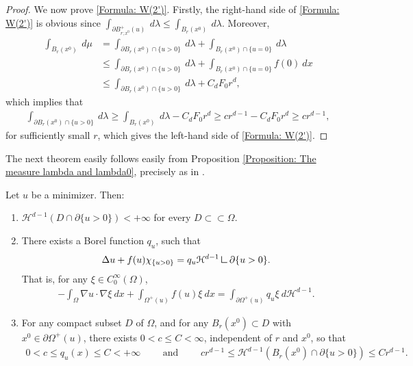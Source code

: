 \documentclass[11pt,reqno]{amsart}
\begin{document}
\begin{proof}
    We now prove \eqref{Formula: W(2')}. Firstly, the right-hand side of \eqref{Formula: W(2')} is obvious since $\int_{\partial B_{r;x^{0}}^{+}(u)}\:d\lambda\leqslant\int_{B_{r}(x^{0})}\:d\lambda$. Moreover,
    \begin{align*}
    	\int_{B_{r}(x^{0})}\:d\mu&=\int_{\partial B_{r}(x^{0})\cap\{u>0\}}\:d\lambda+\int_{B_{r}(x^{0})\cap\{u=0\}}\:d\lambda\\
    	&\leqslant\int_{\partial B_{r}(x^{0})\cap\{u>0\}}\:d\lambda+\int_{B_{r}(x^{0})\cap\{u=0\}}f(0)\:dx\\
    	&\leqslant\int_{\partial B_{r}(x^{0})\cap\{u>0\}}\:d\lambda+C_{d}F_{0}r^{d},
    \end{align*}
    which implies that
    \begin{align*}
    	\int_{\partial B_{r}(x^{0})\cap\{u>0\}}\:d\lambda\geqslant\int_{B_{r}(x^{0})}\:d\lambda-C_{d}F_{0}r^{d}\geqslant cr^{d-1}-C_{d}F_{0}r^{d}\geqslant cr^{d-1},
    \end{align*}
    for sufficiently small $r$, which gives the left-hand side of \eqref{Formula: W(2')}.
\end{proof}
The next theorem easily follows easily from Proposition \ref{Proposition: The measure lambda and lambda0}, precisely as in \cite{AC1981}.
\begin{theorem}\label{Theorem: representation theorem}
	Let $u$ be a minimizer. Then:
	\begin{enumerate}
		\item $\mathcal{H}^{d-1}(D\cap\partial\{u>0\})<+\infty$ for every $D\subset\subset\Omega$.
		\item There exists a Borel function $q_{u}$, such that
		\begin{align*}
			\Delta u+f(u)\chi_{\{u>0\}}=q_{u}\mathcal{H}^{d-1}\mres{\partial\{u>0\}}.
		\end{align*}
	   That is, for any $\xi\in C_{0}^{\infty}(\Omega)$,
	   \begin{align*}
	   	   -\int_{\Omega}\nabla u\cdot\nabla\xi\:dx+\int_{\varOmega^{+}(u)}f(u)\xi\:dx=\int_{\partial\varOmega^{+}(u)}q_{u}\xi\:d\mathcal{H}^{d-1}.
	   \end{align*}
	   \item For any compact subset $D$ of $\Omega$, and for any $B_{r}(x^{0})\subset D$ with $x^{0}\in\partial\varOmega^{+}(u)$, there exists $0<c\leqslant C<\infty$, independent of $r$ and $x^{0}$, so that
	   \begin{align*}
	   	    0<c\leqslant q_{u}(x)\leqslant C<+\infty\qquad\text{ and }\qquad cr^{d-1}\leqslant\mathcal{H}^{d-1}(B_{r}(x^{0})\cap\partial\{u>0\})\leqslant Cr^{d-1}.
	   \end{align*}
	\end{enumerate}
\end{theorem}
\end{document}
